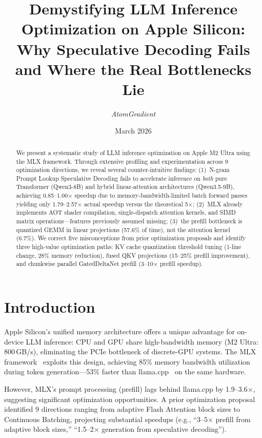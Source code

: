 \documentclass[11pt,a4paper]{article}
\title{%
  \textbf{Demystifying LLM Inference Optimization on Apple Silicon:\\
  Why Speculative Decoding Fails and Where the Real Bottlenecks Lie}
}
\author{
  \textit{AtomGradient}
}
\date{March 2026}
\begin{document}
\maketitle

\begin{abstract}
We present a systematic study of LLM inference optimization on Apple M2 Ultra using the MLX framework. Through extensive profiling and experimentation across 9 optimization directions, we reveal several counter-intuitive findings: (1)~N-gram Prompt Lookup Speculative Decoding fails to accelerate inference on \emph{both} pure Transformer (Qwen3-8B) and hybrid linear-attention architectures (Qwen3.5-9B), achieving 0.85--1.00$\times$ speedup due to memory-bandwidth-limited batch forward passes yielding only 1.79--2.57$\times$ actual speedup versus the theoretical 5$\times$; (2)~MLX already implements AOT shader compilation, single-dispatch attention kernels, and SIMD matrix operations---features previously assumed missing; (3)~the prefill bottleneck is quantized GEMM in linear projections (57.6\% of time), not the attention kernel (6.7\%). We correct five misconceptions from prior optimization proposals and identify three high-value optimization paths: KV cache quantization threshold tuning (1-line change, 28\% memory reduction), fused QKV projections (15--25\% prefill improvement), and chunkwise parallel GatedDeltaNet prefill (3--10$\times$ prefill speedup).
\end{abstract}

\section{Introduction}

Apple Silicon's unified memory architecture offers a unique advantage for on-device LLM inference: CPU and GPU share high-bandwidth memory (M2 Ultra: 800\,GB/s), eliminating the PCIe bottleneck of discrete-GPU systems. The MLX framework~\cite{mlx} exploits this design, achieving 85\% memory bandwidth utilization during token generation---53\% faster than llama.cpp~\cite{llamacpp} on the same hardware.

However, MLX's prompt processing (prefill) lags behind llama.cpp by 1.9--3.6$\times$, suggesting significant optimization opportunities. A prior optimization proposal~\cite{prior_proposal} identified 9 directions ranging from adaptive Flash Attention block sizes to Continuous Batching, projecting substantial speedups (e.g., ``3--5$\times$ prefill from adaptive block sizes,'' ``1.5--2$\times$ generation from speculative decoding'').
\end{document}
